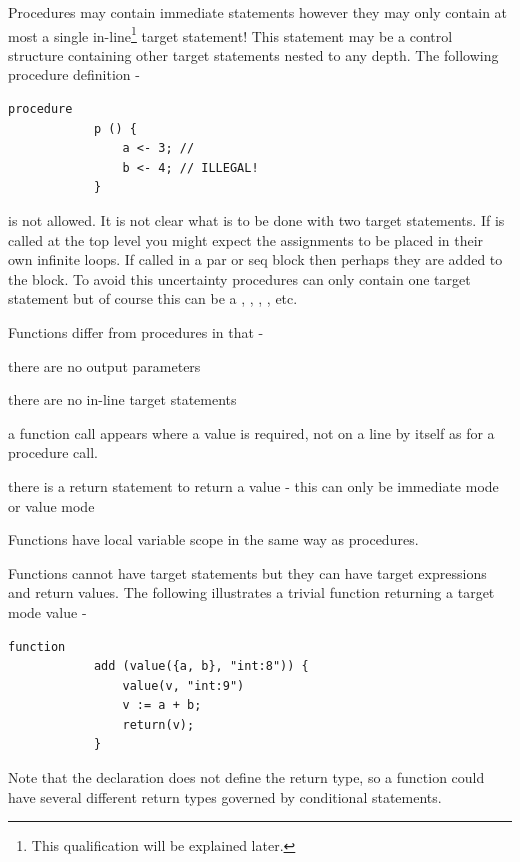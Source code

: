         Procedures may contain immediate statements however they may only contain at
        most a single in-line\footnote{This qualification will be explained later.}
        target statement! This statement may be a control structure containing other
        target statements nested to any depth. The following procedure definition -
        \pagebreak
        \begin{lstlisting}[language=threepl]
            procedure
            p () {
                a <- 3; //
                b <- 4; // ILLEGAL!
            }
        \end{lstlisting}
        is not allowed. It is not clear what is to be done with two target statements.
        If  is called at the top level you might expect the assignments to be
        placed in their own infinite loops. If called in a par{} or seq{} block then
        perhaps they are added to the block. To avoid this uncertainty procedures
        can only contain one target statement but of course this can be a
        , , , ,  etc.

        Functions differ from procedures in that -
        \blist
        \item   there are no output parameters
        \item   there are no in-line target statements
        \item   a function call appears where a value is required, not on
                a line by itself as for a procedure call.
        \item   there is a return statement to return a value - this can only
                be immediate mode or value mode
        \blend

        Functions have local variable scope in the same way as procedures.

        Functions cannot have target statements but they can have target
        expressions and return values. The following illustrates a trivial
        function returning a target mode value -
        \begin{lstlisting}[language=threepl]
            function
            add (value({a, b}, "int:8")) {
                value(v, "int:9")
                v := a + b;
                return(v);
            }
        \end{lstlisting}
        Note that the declaration does not define the return type, so a function
        could have several different return types governed by conditional
        statements.

